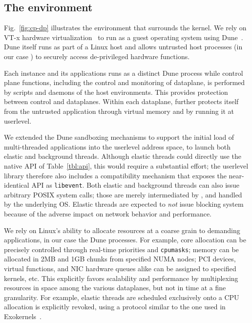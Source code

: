 \subsection{The environment}
\label{sec:impl:env}



Fig.~\ref{fig:cp-dp} illustrates the environment that surrounds the
\ix kernel.  We rely on VT-x hardware
virtualization~\cite{DBLP:journals/computer/UhligNRSMABKLS05} to run
\ix as a guest operating system using Dune~\cite{belay2012dune}. Dune
itself runs as part of a Linux host and allows untrusted host
processes (in our case \ix) to securely access de-privileged hardware
functions.

Each \ix instance and its applications runs as a distinct Dune process
while control plane functions, including the control and monitoring of
dataplane, is performed by scripts and daemons of the host
environments.  This provides protection between control and
dataplanes. Within each dataplane, \ix further protects itself from
the untrusted application through virtual memory and by running it at
userlevel.

 We extended the Dune
sandboxing mechanisms to support the initial load of multi-threaded
applications into the userlevel address space, to launch both elastic
and background threads.  Although elastic threads could directly use
the native API of Table~\ref{tbl:api}, this would require a
substantial effort; the userlevel library therefore also includes a
compatibility mechanism that exposes the near-identical API as
\texttt{libevent}.  Both elastic and background threads can also issue arbitrary POSIX system
calls; those are merely intermediated by \ix, and handled by the
underlying OS.  Elastic threads are expected to \emph{not} issue blocking
system because of the adverse impact on network behavior and
performance.

We rely on Linux's ability to allocate resources at a coarse grain to
demanding applications, in our case the Dune processes.  For example,
core allocation can be precisely controlled through real-time
priorities and \texttt{cpumasks}; memory can be allocated in 2MB and
1GB chunks from specified NUMA nodes; PCI devices, virtual functions,
and NIC hardware queues alike can be assigned to specified \ix
kernels, etc.  This explicitly favors scalability and performance by
multiplexing resources in space among the various dataplanes, but not
in time at a fine granularity.  For example, elastic threads are scheduled exclusively onto a CPU
allocation is explicitly revoked, using a protocol similar to the one
used in Exokernels~\cite{DBLP:conf/sosp/EnglerKO95}.  

